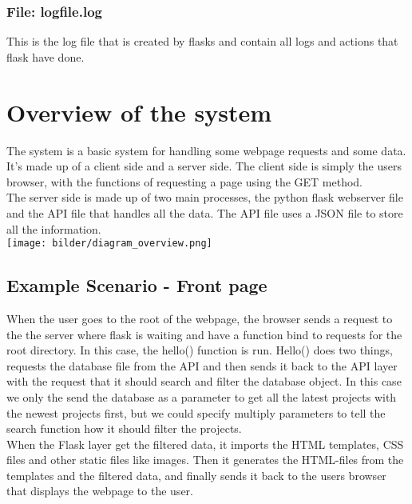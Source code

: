 \documentclass{TDP003mall}
\begin{document}
\subsubsection{File: logfile.log}
This is the log file that is created by flasks and contain all logs and actions that flask have done.




\newpage
\section{Overview of the system}
The system is a basic system for handling some webpage requests and some data.\\

It's made up of a client side and a server side. The client side is simply the users browser, with the functions of requesting a page using the GET method.\\

The server side is made up of two main processes, the python flask webserver file and the API file that handles all the data. The API file uses a JSON file to store all the information.\\

\texttt{[image: bilder/diagram\_overview.png]}




\newpage
\subsection{Example Scenario - Front page}
When the user goes to the root of the webpage, the browser sends a request to the the server where flask is waiting and have a function bind to requests for the root directory. In this case, the hello() function is run. Hello() does two things, requests the database file from the API and then sends it back to the API layer with the request that it should search and filter the database object. In this case we only the send the database as a parameter to get all the latest projects with the newest projects first, but we could specify multiply parameters to tell the search function how it should filter the projects.\\

When the Flask layer get the filtered data, it imports the HTML templates, CSS files and other static files like images. Then it generates the HTML-files from the templates and the filtered data, and finally sends it back to the users browser that displays the webpage to the user.\\
\end{document}
